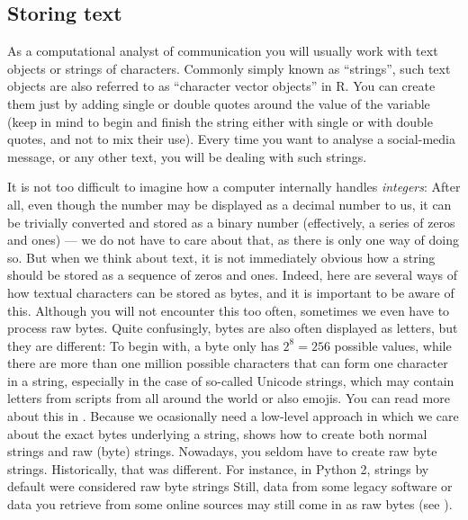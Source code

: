 



\subsection{Storing text}

As a computational analyst of communication you will usually work with
text objects or strings of characters. Commonly simply known as ``strings'',
such text objects are also referred to as ``character vector objects'' in R.
You can create them just by adding single or double quotes around the value of the variable (keep in mind to begin and finish the string either with single or with double quotes, and not to mix their use). Every time you want to analyse a social-media message, or any other text, you will be dealing with such strings. 


It is not too difficult to imagine how a computer internally
handles \emph{integers}: After all, even though the number may be displayed
as a decimal number to us, it can be trivially converted and stored
as a binary number (effectively, a series of zeros and ones)
--- we do not have to care about that, as there
is only one way of doing so. But when we think about text, it is not
immediately obvious how a string should be stored as a sequence of
zeros and ones.
Indeed, here are several ways of how textual characters can be stored as
bytes, and it is important to be aware of this.
Although you will not encounter this too often, sometimes
we even have to process raw bytes. Quite confusingly, bytes are also often
displayed as letters, but they are different: To begin with, a byte
only has $2^8=256$ possible values, while there are more than one
million possible characters that can form one character in a
string, especially in the case of so-called Unicode strings, which may contain letters
from scripts from all around the world or also emojis.
You can read more about this in
.  Because we ocasionally need a low-level approach in which we care about the exact
bytes underlying a string,   shows how to create both normal strings and raw
(byte) strings. Nowadays, you seldom have to 
create raw byte strings.  Historically, that was different. For instance,
in Python 2, strings by default were considered raw byte strings
Still, data from some legacy software or data you retrieve from 
some online sources may still come in as raw bytes (see ).

